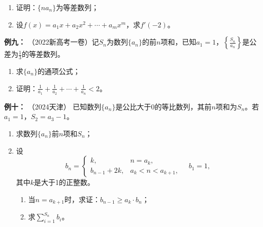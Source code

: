 \documentclass{article}
\begin{document}
\begin{enumerate}[label=(\Roman*)]
    \item 证明：$\{na_n\}$为等差数列；
    \item 设$f(x) = a_1x + a_2x^2 + \cdots + a_mx^m$，求$f'(-2)$。
\end{enumerate}
\vspace{18\baselineskip}

\noindent \textbf{例九： }（2022新高考一卷）记$S_n$为数列$\{a_n\}$的前$n$项和，已知$a_1 = 1$，$\left\{\frac{S_n}{a_n}\right\}$是公差为$\frac{1}{3}$的等差数列。

\begin{enumerate}[label=(\Roman*)]
    \item 求$\{a_n\}$的通项公式；
    \item 证明：$\frac{1}{a_1} + \frac{1}{a_2} + \cdots + \frac{1}{a_n} < 2$。
\end{enumerate}
\newpage

\noindent \textbf{例十： }（2024天津） 已知数列$\{a_n\}$是公比大于0的等比数列，其前$n$项和为$S_n$。若$a_1 = 1$，$S_2 = a_3 - 1$。

\begin{enumerate}[label=(\arabic*)]
    \item 求数列$\{a_n\}$前$n$项和$S_n$；
    \item 设
          \[
          b_n =
          \begin{cases}
              k, & n = a_k, \\
              b_{n-1} + 2k, & a_k < n < a_{k+1},
          \end{cases}
          \quad
          b_1 = 1,
          \]
          其中$k$是大于1的正整数。
          \begin{enumerate}[label=(\roman*)]
              \item 当$n = a_{k+1}$时，求证：$b_{n-1} \ge a_k \cdot b_n$；
              \item 求$\displaystyle\sum_{i=1}^{S_n} b_i$。
          \end{enumerate}
\end{enumerate}
\end{document}

